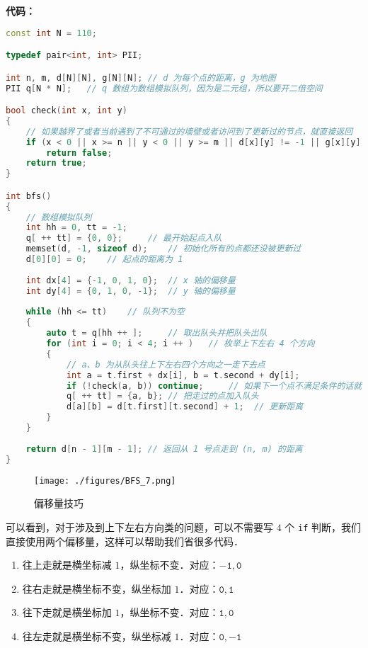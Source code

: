 \textbf{代码：}
\begin{lstlisting}[language=cpp]
const int N = 110;

typedef pair<int, int> PII;

int n, m, d[N][N], g[N][N]; // d 为每个点的距离，g 为地图
PII q[N * N];   // q 数组为数组模拟队列，因为是二元组，所以要开二倍空间

bool check(int x, int y)
{
    // 如果越界了或者当前遇到了不可通过的墙壁或者访问到了更新过的节点，就直接返回
    if (x < 0 || x >= n || y < 0 || y >= m || d[x][y] != -1 || g[x][y] == 1) 
        return false;
    return true;
}

int bfs()
{
    // 数组模拟队列
    int hh = 0, tt = -1;
    q[ ++ tt] = {0, 0};     // 最开始起点入队
    memset(d, -1, sizeof d);    // 初始化所有的点都还没被更新过
    d[0][0] = 0;    // 起点的距离为 1
    
    int dx[4] = {-1, 0, 1, 0};  // x 轴的偏移量
    int dy[4] = {0, 1, 0, -1};  // y 轴的偏移量
    
    while (hh <= tt)    // 队列不为空
    {
        auto t = q[hh ++ ];     // 取出队头并把队头出队
        for (int i = 0; i < 4; i ++ )   // 枚举上下左右 4 个方向
        {
            // a、b 为从队头往上下左右四个方向之一走下去点
            int a = t.first + dx[i], b = t.second + dy[i];   
            if (!check(a, b)) continue;     // 如果下一个点不满足条件的话就往下一个方向走
            q[ ++ tt] = {a, b}; // 把走过的点加入队头
            d[a][b] = d[t.first][t.second] + 1;  // 更新距离
        }
    }
    
    return d[n - 1][m - 1]; // 返回从 1 号点走到 (n, m) 的距离
}  
\end{lstlisting}

\begin{figure}[ht]
\centering
\texttt{[image: ./figures/BFS\_7.png]}
\caption{偏移量技巧} \label{BFS_fig7}
\end{figure}

可以看到，对于涉及到上下左右方向类的问题，可以不需要写 $4$ 个 \verb|if| 判断，我们直接使用两个偏移量，这样可以帮助我们省很多代码．

\begin{enumerate}
\item 往上走就是横坐标减 $1$，纵坐标不变．对应：$\mathtt{-1, 0}$
\item 往右走就是横坐标不变，纵坐标加 $1$．对应：$\mathtt{0, 1}$
\item 往下走就是横坐标加 $1$，纵坐标不变．对应：$\mathtt{1, 0}$
\item 往左走就是横坐标不变，纵坐标减 $1$．对应：$\mathtt{0, -1}$
\end{enumerate}

